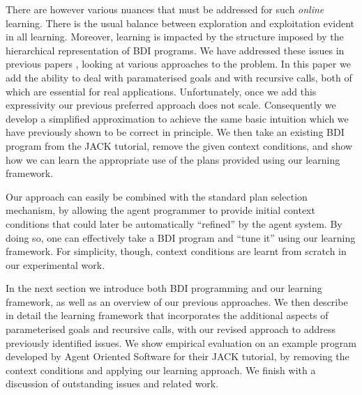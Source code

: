 There are however various nuances that must be addressed for such
\textit{online} learning. There is the usual balance between exploration and
exploitation evident in all learning. Moreover, learning is impacted by
the structure imposed by the hierarchical representation of BDI programs.
%
We have addressed these issues in previous papers
\cite{Airiau:IJAT:09,Singh:AAMAS10}, looking at various approaches to the
problem. In this paper we add the ability to deal with paramaterised
goals and with recursive calls, both of which are essential for real
applications. Unfortunately, once we add this expressivity our
previous preferred approach does not scale. Consequently we develop a
simplified approximation to achieve the same basic intuition which we
have previously shown to be correct in principle. We then take an existing BDI
program from the JACK tutorial, remove the given context conditions,
and show how we can learn the appropriate use of the plans provided
using our learning framework.

Our approach can easily be combined with the standard plan selection
mechanism, by allowing the agent programmer to provide initial context conditions
that could later be automatically ``refined'' by the agent system. By doing so,
one can effectively take a BDI program and ``tune it'' using our learning
framework.
For simplicity, though, context conditions are learnt from scratch in our
experimental work.

In the next section we introduce both
BDI programming and our learning framework, as well as an overview of
our previous approaches. We then describe in detail
the learning framework that incorporates the additional aspects of
parameterised goals and recursive calls, with our revised approach to
address previously identified issues.
We show empirical evaluation on an example program developed by
Agent Oriented Software for their JACK tutorial, by removing the context
conditions and applying our learning approach.  We finish with a
discussion of outstanding issues and related work.

%
